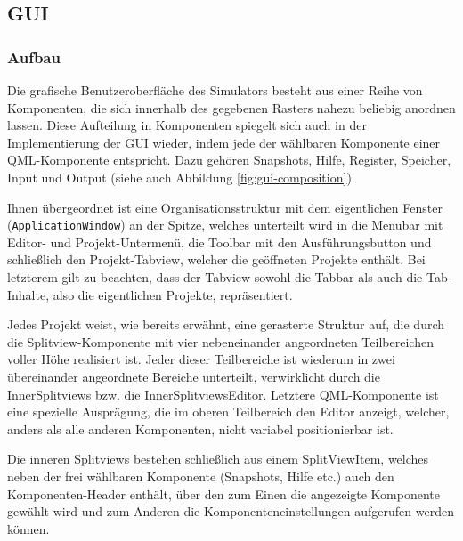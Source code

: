 \subsection{GUI}

\subsubsection{Aufbau}

Die grafische Benutzeroberfläche des Simulators besteht aus einer Reihe von
Komponenten, die sich innerhalb des gegebenen Rasters nahezu beliebig anordnen
lassen. Diese Aufteilung in Komponenten spiegelt sich auch in der
Implementierung der GUI wieder, indem jede der wählbaren Komponente einer
QML-Komponente entspricht. Dazu gehören Snapshots, Hilfe, Register, Speicher,
Input und Output (siehe auch Abbildung \ref{fig:gui-composition}).

Ihnen übergeordnet ist eine Organisationsstruktur mit dem eigentlichen Fenster
(\texttt{ApplicationWindow}) an der Spitze, welches unterteilt wird in die
Menubar mit Editor- und Projekt-Untermenü, die Toolbar mit den Ausführungsbutton
und schließlich den Projekt-Tabview, welcher die geöffneten Projekte enthält.
Bei letzterem gilt zu beachten, dass der Tabview sowohl die Tabbar als auch die
Tab-Inhalte, also die eigentlichen Projekte, repräsentiert.

Jedes Projekt weist, wie bereits erwähnt, eine gerasterte Struktur auf, die
durch die Splitview-Komponente mit vier nebeneinander angeordneten Teilbereichen
voller Höhe realisiert ist. Jeder dieser Teilbereiche ist wiederum in zwei
übereinander angeordnete Bereiche unterteilt, verwirklicht durch die
InnerSplitviews bzw. die InnerSplitviewsEditor. Letztere QML-Komponente ist eine
spezielle Ausprägung, die im oberen Teilbereich den Editor anzeigt, welcher,
anders als alle anderen Komponenten, nicht variabel positionierbar ist.

Die inneren Splitviews bestehen schließlich aus einem SplitViewItem, welches
neben der frei wählbaren Komponente (Snapshots, Hilfe etc.) auch den
Komponenten-Header enthält, über den zum Einen die angezeigte Komponente gewählt
wird und zum Anderen die Komponenteneinstellungen aufgerufen werden können.

